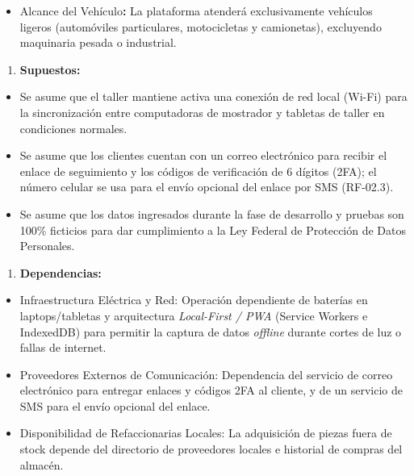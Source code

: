 \begin{itemize}
\item
  Alcance del Vehículo\textbf{:} La plataforma atenderá exclusivamente
  vehículos ligeros (automóviles particulares, motocicletas y
  camionetas), excluyendo maquinaria pesada o industrial.
\end{itemize}

\begin{enumerate}
\def\labelenumi{\arabic{enumi}.}
\setcounter{enumi}{1}
\item
  \textbf{Supuestos:}
\end{enumerate}

\begin{itemize}
\item
  Se asume que el taller mantiene activa una conexión de red local
  (Wi-Fi) para la sincronización entre computadoras de mostrador y
  tabletas de taller en condiciones normales.
\item
  Se asume que los clientes cuentan con un correo electrónico para
  recibir el enlace de seguimiento y los códigos de verificación de 6
  dígitos (2FA); el número celular se usa para el envío opcional del
  enlace por SMS (RF-02.3).
\item
  Se asume que los datos ingresados durante la fase de desarrollo y
  pruebas son 100\% ficticios para dar cumplimiento a la Ley Federal de
  Protección de Datos Personales.
\end{itemize}

\begin{enumerate}
\def\labelenumi{\arabic{enumi}.}
\setcounter{enumi}{2}
\item
  \textbf{Dependencias:}
\end{enumerate}

\begin{itemize}
\item
  Infraestructura Eléctrica y Red: Operación dependiente de baterías en
  laptops/tabletas y arquitectura \emph{Local-First / PWA} (Service
  Workers e IndexedDB) para permitir la captura de datos \emph{offline}
  durante cortes de luz o fallas de internet.
\item
  Proveedores Externos de Comunicación: Dependencia del servicio de
  correo electrónico para entregar enlaces y códigos 2FA al cliente, y
  de un servicio de SMS para el envío opcional del enlace.
\item
  Disponibilidad de Refaccionarias Locales: La adquisición de piezas
  fuera de stock depende del directorio de proveedores locales e
  historial de compras del almacén.
\end{itemize}

